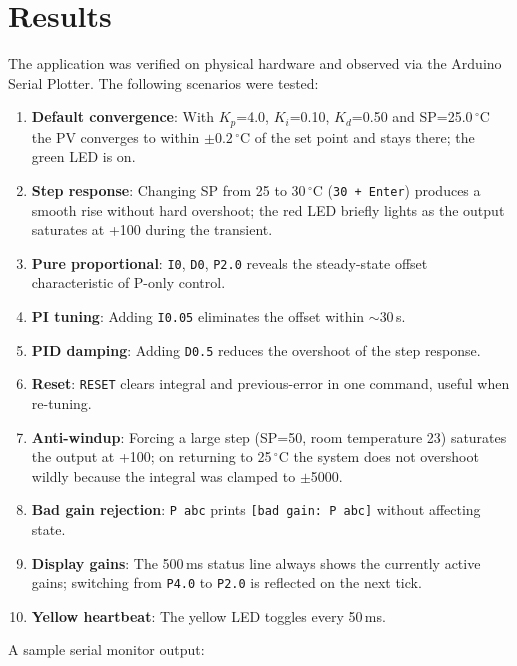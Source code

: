 \documentclass[12pt]{article}
\begin{document}
\section{Results}\label{sec:results}

The application was verified on physical hardware and observed via the Arduino Serial Plotter. The following scenarios were tested:
\begin{enumerate}
  \item \textbf{Default convergence}: With $K_p$=4.0, $K_i$=0.10, $K_d$=0.50 and SP=25.0\,$^{\circ}$C the PV converges to within $\pm 0.2\,^{\circ}$C of the set point and stays there; the green LED is on.
  \item \textbf{Step response}: Changing SP from 25 to 30\,$^{\circ}$C (\texttt{30 + Enter}) produces a smooth rise without hard overshoot; the red LED briefly lights as the output saturates at +100 during the transient.
  \item \textbf{Pure proportional}: \texttt{I0}, \texttt{D0}, \texttt{P2.0} reveals the steady-state offset characteristic of P-only control.
  \item \textbf{PI tuning}: Adding \texttt{I0.05} eliminates the offset within $\sim$30\,s.
  \item \textbf{PID damping}: Adding \texttt{D0.5} reduces the overshoot of the step response.
  \item \textbf{Reset}: \texttt{RESET} clears integral and previous-error in one command, useful when re-tuning.
  \item \textbf{Anti-windup}: Forcing a large step (SP=50, room temperature 23) saturates the output at +100; on returning to 25\,$^{\circ}$C the system does not overshoot wildly because the integral was clamped to $\pm$5000.
  \item \textbf{Bad gain rejection}: \texttt{P abc} prints \texttt{[bad gain: P abc]} without affecting state.
  \item \textbf{Display gains}: The 500\,ms status line always shows the currently active gains; switching from \texttt{P4.0} to \texttt{P2.0} is reflected on the next tick.
  \item \textbf{Yellow heartbeat}: The yellow LED toggles every 50\,ms.
\end{enumerate}

A sample serial monitor output:
\end{document}
